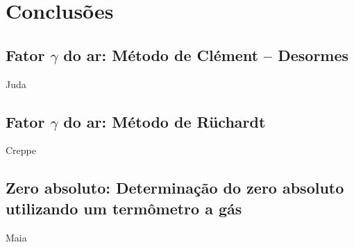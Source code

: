 \newpage
\section{Conclusões}

\subsection{Fator $\gamma$ do ar: Método de Clément – Desormes}

Juda

\subsection{Fator $\gamma$ do ar: Método de Rüchardt}

Creppe

\subsection{Zero absoluto: Determinação do zero absoluto utilizando um termômetro a
gás}

Maia
